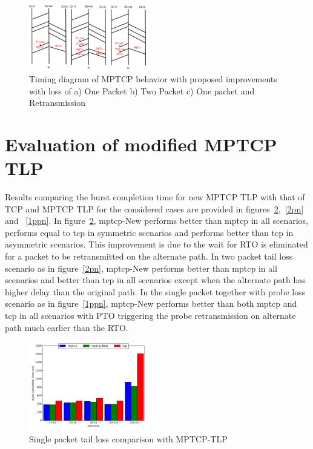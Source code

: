 \documentclass[10pt,draftcls,twocolumn]{IEEEconf}
\begin{document}
\begin{figure}[!ht]
\begin{center}
\includegraphics[angle=0, width=0.46\textwidth]{images/timingER3NewTLP.pdf}
\end{center}
\caption{Timing diagram of MPTCP behavior with proposed improvements with loss of a) One Packet b) Two Packet c) One packet and Retransmission}\label{timingNew}
\end{figure}


\section{Evaluation of modified MPTCP TLP}\label{eval}


Results comparing the burst completion time for new MPTCP TLP with that of TCP and MPTCP TLP for the considered cases are provided in figures~\ref{1pn},~\ref{2pn} and ~\ref{1ppn}. 
In figure~\ref{1pn}, mptcp-New performs better than mptcp in all scenarios, performs equal to tcp in symmetric scenarios and performs better than tcp in asymmetric scenarios. This improvement is due to the wait for RTO is eliminated for a packet to be retransmitted on the alternate path. In two packet tail loss scenario as in figure~\ref{2pn}, mptcp-New performs better than mptcp in all scenarios and better than tcp in all scenarios except when the alternate path has higher delay than the original path. In the single packet together with probe loss scenario as in figure~\ref{1ppn}, mptcp-New performs better than both mptcp and tcp in all scenarios with PTO triggering the probe retransmission on alternate path much earlier than the RTO.


\begin{figure}[!ht]
\begin{center}
\includegraphics[angle=0, width=0.46\textwidth, natwidth=578.16,natheight=433.62]{plots/1PNew.pdf}
\caption{Single packet tail loss comparison with MPTCP-TLP}\label{1pn}
\end{center}
\end{figure}
\end{document}
